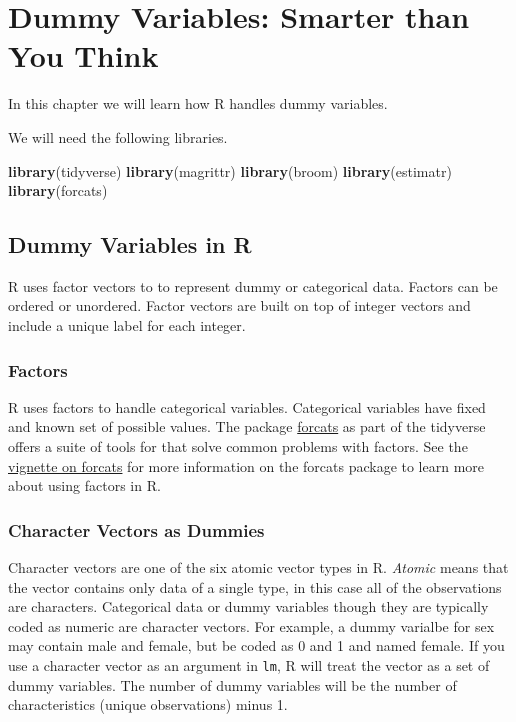 \documentclass[]{book}
\newenvironment{Shaded}{\begin{snugshade}}{\end{snugshade}}
\newcommand{\KeywordTok}[1]{\textcolor[rgb]{0.13,0.29,0.53}{\textbf{#1}}}
\newcommand{\NormalTok}[1]{#1}
\begin{document}
\hypertarget{chp6}{%
\chapter{Dummy Variables: Smarter than You Think}\label{chp6}}

In this chapter we will learn how R handles dummy variables.

We will need the following libraries.

\begin{Shaded}
\begin{Highlighting}[]
\KeywordTok{library}\NormalTok{(tidyverse)}
\KeywordTok{library}\NormalTok{(magrittr)}
\KeywordTok{library}\NormalTok{(broom)}
\KeywordTok{library}\NormalTok{(estimatr)}
\KeywordTok{library}\NormalTok{(forcats)}
\end{Highlighting}
\end{Shaded}

\hypertarget{dummy-variables-in-r}{%
\section{Dummy Variables in R}\label{dummy-variables-in-r}}

R uses factor vectors to to represent dummy or categorical data. Factors can be ordered or unordered. Factor vectors are built on top of integer vectors and include a unique label for each integer.

\hypertarget{factors}{%
\subsection{Factors}\label{factors}}

R uses factors to handle categorical variables. Categorical variables have fixed and known set of possible values. The package \href{https://forcats.tidyverse.org/}{forcats} as part of the tidyverse offers a suite of tools for that solve common problems with factors. See the \href{https://forcats.tidyverse.org/articles/forcats.html}{vignette on forcats} for more information on the forcats package to learn more about using factors in R.

\hypertarget{character-vectors-as-dummies}{%
\subsection{Character Vectors as Dummies}\label{character-vectors-as-dummies}}

Character vectors are one of the six atomic vector types in R. \emph{Atomic} means that the vector contains only data of a single type, in this case all of the observations are characters. Categorical data or dummy variables though they are typically coded as numeric are character vectors. For example, a dummy varialbe for sex may contain male and female, but be coded as 0 and 1 and named female. If you use a character vector as an argument in \texttt{lm}, R will treat the vector as a set of dummy variables. The number of dummy variables will be the number of characteristics (unique observations) minus 1.
\end{document}
